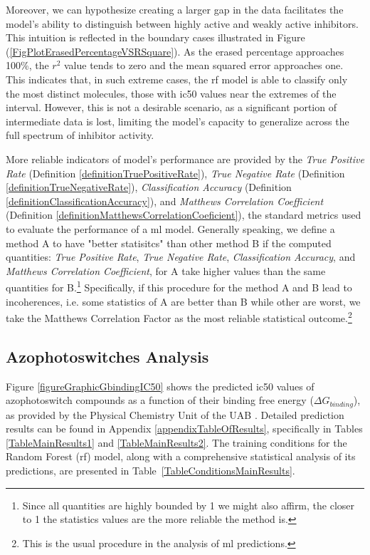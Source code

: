 \documentclass[11pt]{article}
\begin{document}
Moreover, we can hypothesize creating a larger gap in the data facilitates the model’s ability to distinguish between highly active and weakly active inhibitors. This intuition is reflected in the boundary cases illustrated in Figure (\ref{FigPlotErasedPercentageVSRSquare}). As the erased percentage approaches 100\%, the $r^2$ value tends to zero and the mean squared error approaches one. This indicates that, in such extreme cases, the \gls{rf} model is able to classify only the most distinct molecules, those with \gls{ic50} values near the extremes of the interval. However, this is not a desirable scenario, as a significant portion of intermediate data is lost, limiting the model’s capacity to generalize across the full spectrum of inhibitor activity.

More reliable indicators of model's performance are provided by the \emph{True Positive Rate} (Definition \ref{definitionTruePositiveRate}), \emph{True Negative Rate} (Definition \ref{definitionTrueNegativeRate}), \emph{Classification Accuracy} (Definition \ref{definitionClassificationAccuracy}), and \emph{Matthews Correlation Coefficient} (Definition \ref{definitionMatthewsCorrelationCoeficient}), the standard metrics used to evaluate the performance of a \gls{ml} model. Generally speaking, we define a method A to have "better statisitcs" than other method B if the computed quantities: \emph{True Positive Rate}, \emph{True Negative Rate}, \emph{Classification Accuracy}, and \emph{Matthews Correlation Coefficient}, for A take higher values than the same quantities for B.\footnote{Since all quantities are highly bounded by 1 we might also affirm, the closer to 1 the statistics values are the more reliable the method is.} Specifically, if this procedure for the method A and B lead to incoherences, i.e. some statistics of A are better than B while other are worst, we take the Matthews Correlation Factor as the most reliable statistical outcome.\footnote{This is the usual procedure in the analysis of \gls{ml} predictions\cite{MachineLearningPaper5Lipoxygenase}.}

\subsection{Azophotoswitches Analysis}

Figure \ref{figureGraphicGbindingIC50} shows the predicted \gls{ic50} values of azophotoswitch compounds as a function of their binding free energy ($\Delta G_{binding}$), as provided by the Physical Chemistry Unit of the UAB \cite{UAB_ComputationalChemistry}. Detailed prediction results can be found in Appendix \ref{appendixTableOfResults}, specifically in Tables \ref{TableMainResults1} and \ref{TableMainResults2}. The training conditions for the Random Forest (\gls{rf}) model, along with a comprehensive statistical analysis of its predictions, are presented in Table~\ref{TableConditionsMainResults}.
\end{document}
